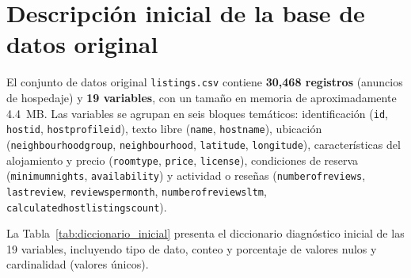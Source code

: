 \documentclass[12pt,letterpaper,oneside]{report}
\newcommand{\ub}{\textunderscore\allowbreak}
\begin{document}
\section{Descripción inicial de la base de datos original}
\label{sec:desc_inicial}

El conjunto de datos original \texttt{listings.csv} contiene \textbf{30,468 registros} (anuncios de hospedaje) y \textbf{19 variables}, con un tamaño en memoria de aproximadamente 4.4~MB. Las variables se agrupan en seis bloques temáticos: identificación (\texttt{id}, \texttt{host\ub id}, \texttt{host\ub profile\ub id}), texto libre (\texttt{name}, \texttt{host\ub name}), ubicación (\texttt{neighbourhood\ub group}, \texttt{neighbourhood}, \texttt{latitude}, \texttt{longitude}), características del alojamiento y precio (\texttt{room\ub type}, \texttt{price}, \texttt{license}), condiciones de reserva (\texttt{minimum\ub nights}, \texttt{availability\ub 365}) y actividad o reseñas (\texttt{number\ub of\ub reviews}, \texttt{last\ub review}, \texttt{reviews\ub per\ub month}, \texttt{number\ub of\ub reviews\ub ltm}, \texttt{calculated\ub host\ub listings\ub count}).

La Tabla~\ref{tab:diccionario_inicial} presenta el diccionario diagnóstico inicial de las 19 variables, incluyendo tipo de dato, conteo y porcentaje de valores nulos y cardinalidad (valores únicos).
\end{document}
